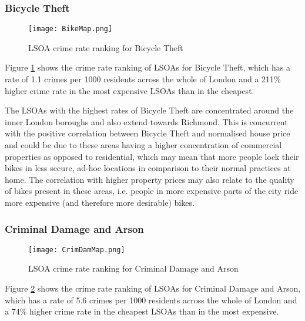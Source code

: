 \documentclass{article}
\begin{document}
\subsubsection{Bicycle Theft}
\begin{figure}[H]
\begin{center}
  \texttt{[image: BikeMap.png]}
  \caption{LSOA crime rate ranking for Bicycle Theft}
  \label{fig:BikeMap}
\end{center}
\end{figure}

Figure \ref{fig:BikeMap} shows the crime rate ranking of LSOAs for Bicycle Theft, which has a rate of 1.1 crimes per 1000 residents across the whole of London and a 211\% higher crime rate in the most expensive LSOAs than in the cheapest.
\newline

The LSOAs with the highest rates of Bicycle Theft are concentrated around the inner London boroughs and also extend towards Richmond. This is concurrent with the positive correlation between Bicycle Theft and normalised house price and could be due to these areas having a higher concentration of commercial properties as opposed to residential, which may mean that more people lock their bikes in less secure, ad-hoc locations in comparison to their normal practices at home. The correlation with higher property prices may also relate to the quality of bikes present in these areas, i.e. people in more expensive parts of the city ride more expensive (and therefore more desirable) bikes.
\newline

\subsubsection{Criminal Damage and Arson}
\begin{figure}[H]
\begin{center}
  \texttt{[image: CrimDamMap.png]}
  \caption{LSOA crime rate ranking for Criminal Damage and Arson}
  \label{fig:CrimDamMap}
\end{center}
\end{figure}

Figure \ref{fig:CrimDamMap} shows the crime rate ranking of LSOAs for Criminal Damage and Arson, which has a rate of 5.6 crimes per 1000 residents across the whole of London and a 74\% higher crime rate in the cheapest LSOAs than in the most expensive.
\newline 
\end{document}
